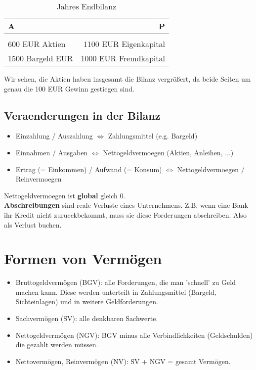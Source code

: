 \documentclass[a4paper]{article}
\begin{document}
\begin{table}
	\centering
	\caption{Jahres Endbilanz}
	\label{tab:label}
	\begin{tabular}{l|r}
		A                & P                     \\
		\hline                                   \\
		600 EUR Aktien   & 1100 EUR Eigenkapital \\
		1500 Bargeld EUR & 1000 EUR Fremdkapital \\
	\end{tabular}
\end{table}

Wir sehen, die Aktien haben insgesamt die Bilanz vergrößert, da beide Seiten
um genau die 100 EUR Gewinn gestiegen sind.

\subsection{
	Veraenderungen in der Bilanz
}

\begin{itemize}
	\item Einzahlung / Auszahlung $\Leftrightarrow$ Zahlungsmittel (e.g. Bargeld)
	\item Einnahmen / Ausgaben $\Leftrightarrow$ Nettogeldvermoegen (Aktien, Anleihen, ...)
	\item Ertrag (= Einkommen) / Aufwand (= Konsum) $\Leftrightarrow$
	      Nettogeldvermoegen / Reinvermoegen
\end{itemize}

Nettogeldvermoegen ist \textbf{global} gleich 0.
\\

\textbf{Abschreibungen} sind reale Verluste eines Unternehmens. Z.B. wenn
eine Bank ihr Kredit nicht zurueckbekommt, muss sie diese Forderungen
abschreiben. Also als Verlust buchen.

\section{Formen von Vermögen}

\begin{itemize}
	\item Bruttogeldvermögen (BGV): alle Forderungen, die man 'schnell' zu Geld machen
	      kann. Diese werden unterteilt in Zahlungsmittel
	      (Bargeld, Sichteinlagen) und in weitere Geldforderungen.

	\item Sachvermögen (SV): alle denkbaren Sachwerte.

	\item Nettogeldvermögen (NGV): BGV minus alle Verbindlichkeiten (Geldschulden)
	      die gezahlt werden müssen.

	\item Nettovermögen, Reinvermögen (NV): SV + NGV = gesamt Vermögen.
\end{itemize}
\end{document}
